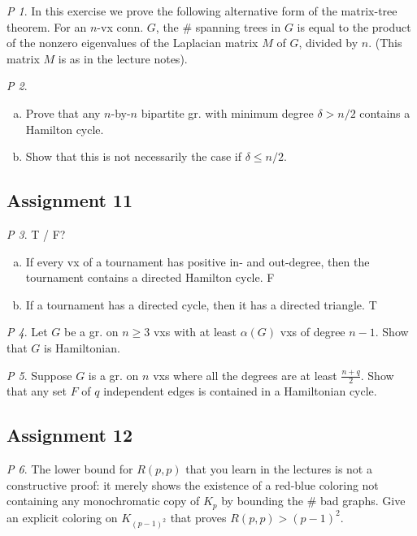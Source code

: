 \documentclass[11pt, fleqn, a4paper, landscape]{article}
\theoremstyle{plain} %
\theoremstyle{remark} %
\newtheorem{problem}{P}
\theoremstyle{definition} %
\begin{document}
\begin{multicols}{5}
\begin{problem}
In this exercise we prove the following alternative form of the matrix-tree theorem. For an $n$-vx conn. $G$, the \# spanning trees in $G$ is equal to the product of the  nonzero eigenvalues of the Laplacian matrix $M$ of $G$, divided by $n$. (This matrix $M$ is as in the lecture notes).
\end{problem}

\begin{problem}
\begin{enumerate}[(a)]
\item Prove that any $n$-by-$n$ bipartite gr. with minimum degree $\delta > n/2$ contains a Hamilton cycle.
\item  Show that this is not necessarily the case if $\delta\le n/2$.
\end{enumerate}
\end{problem}

\subsection{Assignment 11}

\begin{problem}
T / F?
\begin{enumerate}[(a)]
\item If every vx of a tournament has positive in- and out-degree, then the tournament contains a directed Hamilton cycle. F
\item If a tournament has a directed cycle, then it has a directed triangle. T
\end{enumerate} 
\end{problem}

\begin{problem}
Let $G$ be a gr. on $n \ge 3$ vxs with at least $\alpha(G)$ vxs of degree $n- 1$. Show that $G$ is Hamiltonian.
\end{problem}

\begin{problem}
Suppose $G$ is a gr. on $n$ vxs where all the degrees are at least $\frac{n+q}{2}$. Show that any set $F$ of $q$ independent edges is contained in a Hamiltonian cycle.
\end{problem}

\subsection{Assignment 12}

\begin{problem}
The lower bound for $R(p, p)$ that you learn in the lectures is not a constructive proof: it merely shows the existence of a red-blue coloring not containing any monochromatic copy of $K_p$ by bounding the \# bad graphs. Give an explicit coloring on $K_{(p-1)^2}$ that proves $R(p, p) > (p - 1)^2$.
\end{problem}


\end{multicols}
\end{document}
